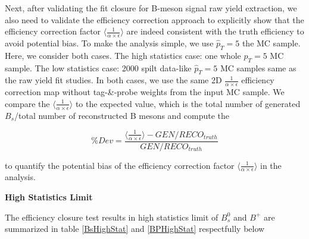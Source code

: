 Next, after validating the fit closure for B-meson signal raw yield extraction, we also need to validate the efficiency correction approach to explicitly show that the efficiency correction factor $\langle\frac{1}{\alpha \times \epsilon} \rangle$ are indeed consistent with the truth efficiency to avoid potential bias. To make the analysis simple, we use $\hat p_T = 5$ the MC sample. Here, we consider both cases. The high statistics case: one whole $\hat p_T = 5$ MC sample. The low statistics case: 2000 spilt data-like $\hat p_T = 5$ MC samples same as the raw yield fit studies. In both cases, we use the same 2D $\frac{1}{\alpha \times \epsilon}$ efficiency correction map without tag-\&-probe weights from the input MC sample. We compare the $\langle \frac{1}{\alpha \times \epsilon}\rangle$ to the expected value, which is the total number of generated $B_s$/total number of reconstructed B mesons and compute the 


\begin{equation}
\% Dev = \frac{\langle \frac{1}{\alpha \times \epsilon} \rangle - GEN/RECO_{truth}}{GEN/RECO_{truth}}
\end{equation}
 
to quantify the potential bias of the efficiency correction factor $\langle \frac{1}{\alpha \times \epsilon} \rangle$ in the analysis. 

\textbf{High Statistics Limit}

The efficiency closure test results in high statistics limit of $B^0_s$ and $B^+$ are summarized in table \ref{BsHighStat} and \ref{BPHighStat} respectfully below


